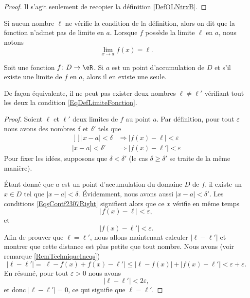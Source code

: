 \begin{proof}
    Il s'agit seulement de recopier la définition \ref{DefOLNtrxB}.
\end{proof}

Si aucun nombre $\ell$ ne vérifie la condition de la définition, alors on dit que la fonction n'admet pas de limite en $a$. Lorsque $f$ possède la limite $\ell$ en $a$, nous notons
\begin{equation}
	\lim_{x\to a} f(x)=\ell.
\end{equation}

\begin{proposition}
	Soit une fonction $f\colon D\to \eR$. Si $a$ est un point d'accumulation de $D$ et s'il existe une limite de $f$ en $a$, alors il en existe une seule. 
\end{proposition}

De façon équivalente, il ne peut pas exister deux nombres $\ell\neq\ell'$ vérifiant tout les deux la condition \eqref{EqDefLimiteFonction}.

\begin{proof}
	Soient $\ell$ et $\ell'$ deux limites de $f$ au point $a$. Par définition, pour tout $\varepsilon$ nous avons des nombres $\delta$ et $\delta'$ tels que
	\begin{equation}	\label{EqsContf2307Right}
		\begin{aligned}[]
			| x-a |<\delta&\Rightarrow \big| f(x)-\ell \big|<\varepsilon\\
			| x-a |<\delta'&\Rightarrow \big| f(x)-\ell' \big|<\varepsilon
		\end{aligned}
	\end{equation}
	Pour fixer les idées, supposons que $\delta<\delta'$ (le cas $\delta\geq\delta'$ se traite de la même manière).

	Étant donné que $a$ est un point d'accumulation du domaine $D$ de $f$, il existe un $x\in D$ tel que $| x-a |<\delta$. Évidemment, nous avons aussi $| x-a |<\delta'$. Les conditions \eqref{EqsContf2307Right} signifient alors que ce $x$ vérifie en même temps
	\begin{equation}
		| f(x)-\ell |<\varepsilon,
	\end{equation}
	et
	\begin{equation}
		| f(x)-\ell' |<\varepsilon.
	\end{equation}
	Afin de prouver que $\ell=\ell'$, nous allons maintenant calculer $| \ell-\ell' |$ et montrer que cette distance est plus petite que tout nombre. Nous avons (voir remarque \ref{RemTechniqueIneqs})
	\begin{equation}	\label{EqInesq2307ellellepr}
		| \ell-\ell' |=| \ell-f(x)+f(x)-\ell' |\leq | \ell-f(x) |+| f(x)-\ell' |<\varepsilon+\varepsilon.
	\end{equation}
	En résumé, pour tout $\varepsilon>0$ nous avons
	\begin{equation}
		| \ell-\ell' |<2\varepsilon,
	\end{equation}
	et donc $| \ell-\ell' |=0$, ce qui signifie que $\ell=\ell'$.
\end{proof}

